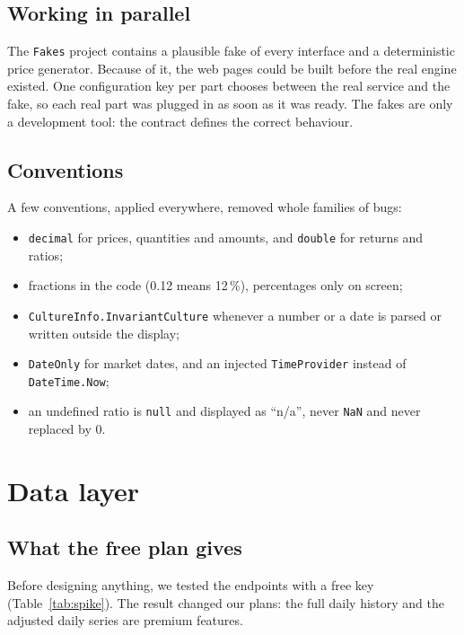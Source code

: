 \documentclass[11pt,a4paper]{article}
\newcommand{\code}[1]{\texttt{\small #1}}
\begin{document}
\subsection{Working in parallel}

The \code{Fakes} project contains a plausible fake of every interface and a deterministic price generator. Because of it, the web pages could be built before the real engine existed. One configuration key per part chooses between the real service and the fake, so each real part was plugged in as soon as it was ready. The fakes are only a development tool: the contract defines the correct behaviour.

\subsection{Conventions}

A few conventions, applied everywhere, removed whole families of bugs:

\begin{itemize}
\item \code{decimal} for prices, quantities and amounts, and \code{double} for returns and ratios;
\item fractions in the code (0.12 means 12\,\%), percentages only on screen;
\item \code{CultureInfo.InvariantCulture} whenever a number or a date is parsed or written outside the display;
\item \code{DateOnly} for market dates, and an injected \code{TimeProvider} instead of \code{DateTime.Now};
\item an undefined ratio is \code{null} and displayed as ``n/a'', never \code{NaN} and never replaced by 0.
\end{itemize}

\section{Data layer}
\label{sec:data}

\subsection{What the free plan gives}

Before designing anything, we tested the endpoints with a free key (Table~\ref{tab:spike}). The result changed our plans: the full daily history and the adjusted daily series are premium features.
\end{document}
